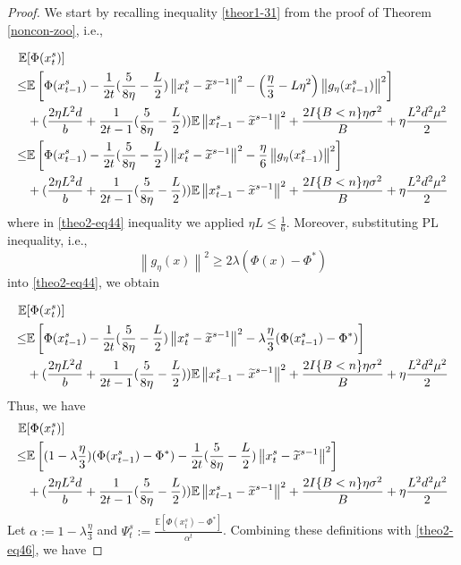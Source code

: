 \documentclass{article}
\newcommand*{\E}{\mathbb{E}}
\newcommand{\norm}[1]{\left\lVert#1\right\rVert}
\theoremstyle{definition}
\theoremstyle{remark}
\begin{document}
\begin{proof}
We start by recalling inequality \eqref{theor1-31} from the proof of Theorem \ref{noncon-zoo}, i.e.,

{\color{Brown}
\begin{align} 
\E&[\Phi({x}_{t}^s)] \notag
\\ \leq& \E\left[\Phi({x}_{t-1}^s)  -\frac{1}{2t}(\frac{5}{8\eta} - \frac{L}{2})\norm{{x}_t^s-\widetilde{x}^{s-1}}^2- \left(\frac{\eta}{3}-L\eta^2\right)\norm{g_{\eta}(x_{t-1}^s)}^2\right]\notag\\
&+(\frac{2\eta L^2 d}{b}+\frac{1}{2t-1}(\frac{5}{8\eta} - \frac{L}{2}))\E\norm{x_{t-1}^s-\widetilde{x}^{s-1}}^2
+ \frac{2I\{B < n\}\eta \sigma ^2}{B}+\eta \frac{L^2 d^2 \mu^2}{2}\notag
\\ \leq& \E\left[\Phi({x}_{t-1}^s)  -\frac{1}{2t}(\frac{5}{8\eta} - \frac{L}{2})\norm{{x}_t^s-\widetilde{x}^{s-1}}^2- \frac{\eta}{6}\norm{g_{\eta}(x_{t-1}^s)}^2\right]\notag\\
&+(\frac{2\eta L^2 d}{b}+\frac{1}{2t-1}(\frac{5}{8\eta} - \frac{L}{2}))\E\norm{x_{t-1}^s-\widetilde{x}^{s-1}}^2
+ \frac{2I\{B < n\}\eta \sigma ^2}{B}+\eta \frac{L^2 d^2 \mu^2}{2}\label{theo2-eq44}
 \end{align}
 where in \eqref{theo2-eq44} inequality we applied $\eta L \leq \frac{1}{6}$.
 }
Moreover, substituting PL inequality, i.e., 
\begin{equation}
\norm{g_{\eta}(x)}^2 \geq 2\lambda (\Phi(x) - \Phi^*)
\end{equation}
into \eqref{theo2-eq44}, we obtain

{\color{Brown}
\begin{align} 
\E&[\Phi({x}_{t}^s)] \notag
\\ \leq& \E\left[\Phi({x}_{t-1}^s)  -\frac{1}{2t}(\frac{5}{8\eta} - \frac{L}{2})\norm{{x}_t^s-\widetilde{x}^{s-1}}^2- \lambda\frac{\eta}{3}(\Phi({x}_{t-1}^s) - \Phi^*) \right]\notag\\
&+(\frac{2\eta L^2 d}{b}+\frac{1}{2t-1}(\frac{5}{8\eta} - \frac{L}{2}))\E\norm{x_{t-1}^s-\widetilde{x}^{s-1}}^2
+ \frac{2I\{B < n\}\eta \sigma ^2}{B}+\eta \frac{L^2 d^2 \mu^2}{2}
 \end{align}
 }
Thus, we have
{\color{Brown}
\begin{align} 
\E&[\Phi({x}_{t}^s)] \notag
\\ \leq& \E\left[ (1-\lambda\frac{\eta}{3})(\Phi({x}_{t-1}^s) - \Phi^*)   -\frac{1}{2t}(\frac{5}{8\eta} - \frac{L}{2})\norm{{x}_t^s-\widetilde{x}^{s-1}}^2\right]\notag\\
&+(\frac{2\eta L^2 d}{b}+\frac{1}{2t-1}(\frac{5}{8\eta} - \frac{L}{2}))\E\norm{x_{t-1}^s-\widetilde{x}^{s-1}}^2
+ \frac{2I\{B < n\}\eta \sigma ^2}{B}+\eta \frac{L^2 d^2 \mu^2}{2}\label{theo2-eq46}
 \end{align}
 }
Let {\color{Brown}$\alpha := 1 - \lambda\frac{\eta}{3}$} and $\Psi_t^s := \frac{\E[\Phi({x}_{t}^s)-\Phi^*]}{\alpha^t}$. Combining these definitions with \eqref{theo2-eq46}, we have  


\end{proof}
\end{document}
